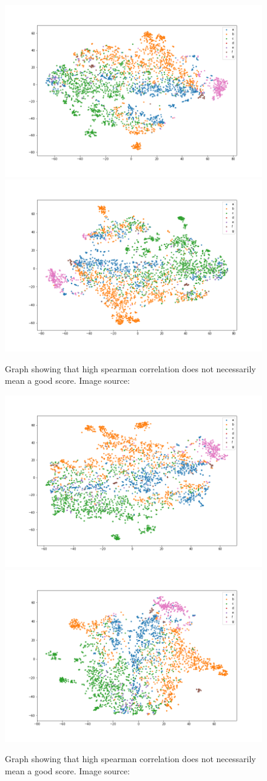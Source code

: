 \begin{figure}[!ht]
  \centering
  \includegraphics[width=0.4\linewidth]{latex/imgs/tsne_2_layer_no_drop_final.png}
  \includegraphics[width=0.4\linewidth]{latex/imgs/tsne_2_layer_no_drop_minloss.png}
  \caption{Graph showing that high spearman correlation does not necessarily mean a good score. Image source:\cite{spearman}}
\end{figure}
\begin{figure}[!ht]
  \centering
  \includegraphics[width=0.4\linewidth]{latex/imgs/tsne_1_layer_no_schedule_512_final.png}
  \includegraphics[width=0.4\linewidth]{latex/imgs/tsne_1_layer_no_schedule_512_minloss.png}
  \caption{Graph showing that high spearman correlation does not necessarily mean a good score. Image source:\cite{spearman}}
\end{figure}
